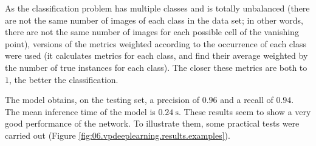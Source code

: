 As the classification problem has multiple classes and is totally unbalanced (there are not the same number of images of each class in the data set; in other words, there are not the same number of images for each possible cell of the vanishing point), versions of the metrics weighted according to the occurrence of each class were used (it calculates metrics for each class, and find their average weighted by the number of true instances for each class). The closer these metrics are both to $1$, the better the classification.

The model obtains, on the testing set, a precision of $\num{0.96}$ and a recall of $\num{0.94}$. The mean inference time of the model is $\SI{0.24}{\second}$. These results seem to show a very good performance of the network. To illustrate them, some practical tests were carried out (Figure \ref{fig:06.vpdeeplearning.results.examples}).

